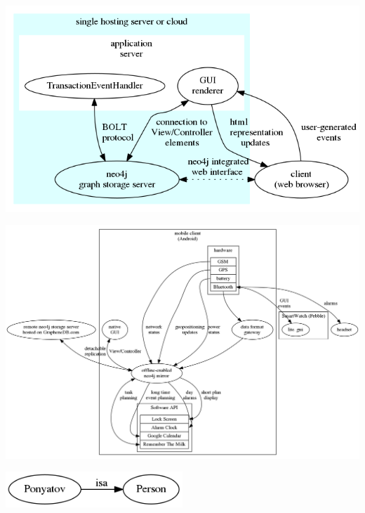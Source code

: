 \documentclass[oneside,12pt]{article}
\begin{document}
\noindent\includegraphics[width=\textwidth]{fig/architecture.png}

\noindent\includegraphics[width=\textwidth]{fig/mobile.png}

\noindent\includegraphics[width=0.5\textwidth]{fig/person.png}
\end{document}
